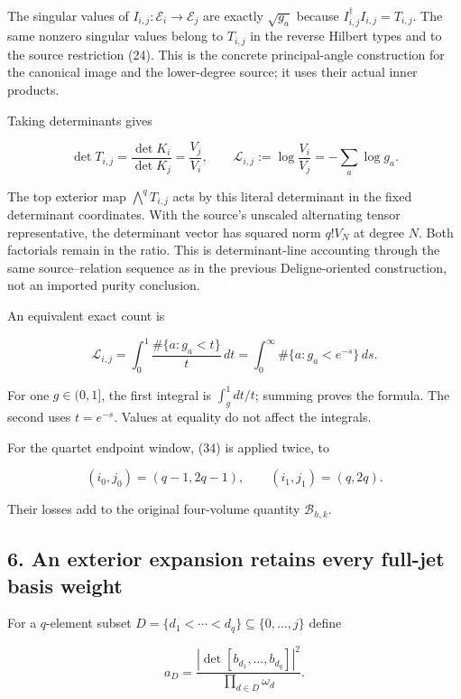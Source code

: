 The singular values of \(I_{i,j}:\mathscr E_i\to\mathscr E_j\) are exactly \(\sqrt{g_a}\) because \(I_{i,j}^\dagger I_{i,j}=T_{i,j}\). The same nonzero singular values belong to \(T_{i,j}\) in the reverse Hilbert types and to the source restriction (24). This is the concrete principal-angle construction for the canonical image and the lower-degree source; it uses their actual inner products.

Taking determinants gives

\[
 \boxed{\det T_{i,j}=\frac{\det K_i}{\det K_j}
 =\frac{V_j}{V_i},\qquad
 \mathcal L_{i,j}:=\log\frac{V_i}{V_j}=-\sum_a\log g_a.}          \tag{34}
\]

The top exterior map \(\bigwedge^qT_{i,j}\) acts by this literal determinant in the fixed determinant coordinates. With the source's unscaled alternating tensor representative, the determinant vector has squared norm \(q!V_N\) at degree \(N\). Both factorials remain in the ratio. This is determinant-line accounting through the same source--relation sequence as in the previous Deligne-oriented construction, not an imported purity conclusion.

An equivalent exact count is

\[
 \boxed{\mathcal L_{i,j}
 =\int_0^1\frac{\#\{a:g_a<t\}}{t}\,dt
 =\int_0^\infty\#\{a:g_a<e^{-s}\}\,ds.}                         \tag{35}
\]

For one \(g\in(0,1]\), the first integral is \(\int_g^1dt/t\); summing proves the formula. The second uses \(t=e^{-s}\). Values at equality do not affect the integrals.

For the quartet endpoint window, (34) is applied twice, to

\[
 (i_0,j_0)=(q-1,2q-1),\qquad(i_1,j_1)=(q,2q).                   \tag{36}
\]

Their losses add to the original four-volume quantity \(\mathcal B_{h,k}\).

\subsection{6. An exterior expansion retains every full-jet basis weight}\label{endpoint-restriction_original--an-exterior-expansion-retains-every-full-jet-basis-weight}

For a \(q\)-element subset \(D=\{d_1<\cdots<d_q\}\subseteq\{0,\ldots,j\}\) define

\[
 a_D=\frac{|\det[b_{d_1},\ldots,b_{d_q}]|^2}
                 {\prod_{d\in D}\omega_d}.                     \tag{37}
\]


